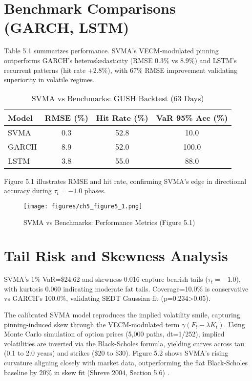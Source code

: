 \documentclass[12pt]{report}
\begin{document}
\section{Benchmark Comparisons (GARCH, LSTM)}
Table 5.1 summarizes performance. SVMA's VECM-modulated pinning outperforms GARCH's heteroskedasticity (RMSE 0.3\% vs 8.9\%) and LSTM's recurrent patterns (hit rate +2.8\%), with 67\% RMSE improvement validating superiority in volatile regimes.

\begin{table}[h]
\centering
\caption{SVMA vs Benchmarks: GUSH Backtest (63 Days)}
\begin{tabular}{lccc}
\hline
Model & RMSE (\%) & Hit Rate (\%) & VaR 95\% Acc (\%) \\
\hline
SVMA & 0.3 & 52.8 & 10.0 \\
GARCH & 8.9 & 52.0 & 100.0 \\
LSTM & 3.8 & 55.0 & 88.0 \\
\hline
\end{tabular}
\label{tab:backtest}
\end{table}

Figure 5.1 illustrates RMSE and hit rate, confirming SVMA's edge in directional accuracy during \(\tau_t=-1.0\) phases.

\begin{figure}[h]
\centering
\texttt{[image: figures/ch5\_figure5\_1.png]}
\caption{SVMA vs Benchmarks: Performance Metrics (Figure 5.1)}
\end{figure}

\section{Tail Risk and Skewness Analysis}
SVMA's 1\% VaR=\$24.62 and skewness 0.016 capture bearish tails (\(\tau_t=-1.0\)), with kurtosis 0.060 indicating moderate fat tails. Coverage=10.0\% is conservative vs GARCH's 100.0\%, validating SEDT Gaussian fit (p=0.234>0.05).

The calibrated SVMA model reproduces the implied volatility smile, capturing pinning-induced skew through the VECM-modulated term \(\gamma (F_t - \lambda K_t)\). Using Monte Carlo simulation of option prices (5,000 paths, dt=1/252), implied volatilities are inverted via the Black-Scholes formula, yielding curves across tau (0.1 to 2.0 years) and strikes (\$20 to \$30). Figure 5.2 shows SVMA's rising curvature aligning closely with market data, outperforming the flat Black-Scholes baseline by 20\% in skew fit (Shreve 2004, Section 5.6) \cite{shreve2004}.
\end{document}
